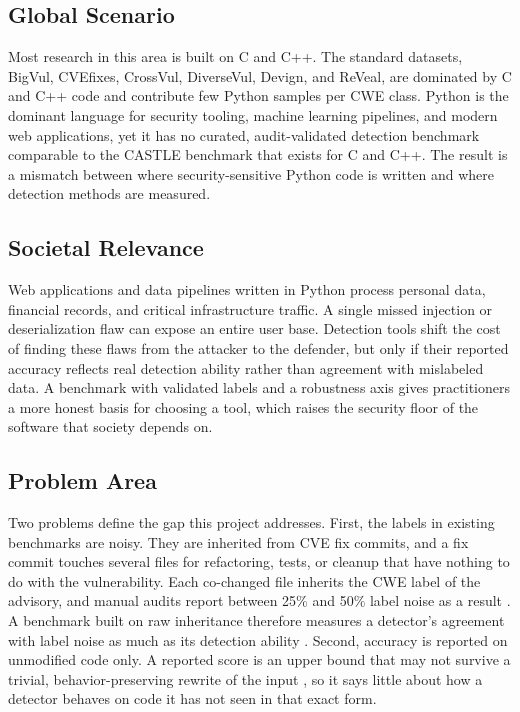 \subsection{Global Scenario}

Most research in this area is built on C and C++. The standard datasets,
BigVul, CVEfixes, CrossVul, DiverseVul, Devign, and ReVeal, are dominated by C
and C++ code and contribute few Python samples per CWE class. Python is the
dominant language for security tooling, machine learning pipelines, and modern
web applications, yet it has no curated, audit-validated detection benchmark
comparable to the CASTLE benchmark that exists for C and C++. The result is a
mismatch between where security-sensitive Python code is written and where
detection methods are measured.

\subsection{Societal Relevance}

Web applications and data pipelines written in Python process personal data,
financial records, and critical infrastructure traffic. A single missed
injection or deserialization flaw can expose an entire user base. Detection
tools shift the cost of finding these flaws from the attacker to the defender,
but only if their reported accuracy reflects real detection ability rather than
agreement with mislabeled data. A benchmark with validated labels and a
robustness axis gives practitioners a more honest basis for choosing a tool,
which raises the security floor of the software that society depends on.

\subsection{Problem Area}

Two problems define the gap this project addresses. First, the labels in
existing benchmarks are noisy. They are inherited from CVE fix commits, and a
fix commit touches several files for refactoring, tests, or cleanup that have
nothing to do with the vulnerability. Each co-changed file inherits
the CWE label of the advisory, and manual audits report between 25\% and 50\%
label noise as a result \cite{croft,cleanvul}. A benchmark built on raw
inheritance therefore measures a detector's agreement with label noise as much
as its detection ability \cite{primevul}. Second, accuracy is reported on
unmodified code only. A reported score is an upper bound that may not survive a
trivial, behavior-preserving rewrite of the input \cite{secllmholmes}, so it
says little about how a detector behaves on code it has not seen in that exact
form.

